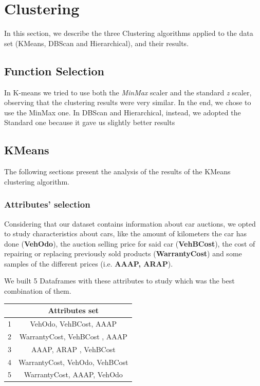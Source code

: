 \documentclass{article}
\begin{document}
	\newpage
	\section{Clustering}
	\label{sec:clustering}
	In this section, we describe the three Clustering algorithms applied to the data set (KMeans, DBScan and Hierarchical), and their results.
	
	\subsection{Function Selection}
	In K-means we tried to use both the \emph{MinMax} scaler and the standard \emph{z} scaler, observing that the clustering results were very similar. In the end, we chose to use the MinMax one. 
	In DBScan and Hierarchical, instead, we adopted the Standard one because it gave us slightly better results
	
	\subsection{KMeans}
	The following sections present the analysis of the results of the KMeans clustering algorithm.
	
	\subsubsection{Attributes' selection}
	Considering that our dataset contains information about car auctions, we opted to study characteristics about cars, like the amount of kilometers the car has done (\textbf{VehOdo}), the auction selling price for said car (\textbf{VehBCost}), the cost of repairing or replacing previously sold products (\textbf{WarrantyCost}) and some samples of the different prices (i.e. \textbf{AAAP, ARAP}).
	
	We built 5 Dataframes with these attributes to study which was the best combination of them.
	
	\begin{table}[H]
		\centering
		\begin{tabular}{c|c}
			\hline
			& Attributes set \\
			\hline
			\rowcolor{Gray}
			1 & VehOdo,  VehBCost,  AAAP \\
			2 & WarrantyCost, VehBCost ,  AAAP  \\
			\rowcolor{Gray}
			3 & AAAP,  ARAP ,  VehBCost \\
			4 & WarrantyCost,  VehOdo,  VehBCost  \\
			\rowcolor{Gray}
			5 & WarrantyCost,  AAAP, VehOdo \\
			\hline
		\end{tabular}
	\end{table}
	
\end{document}
